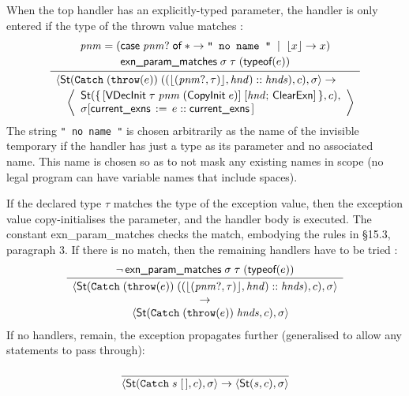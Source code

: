 \documentclass[11pt]{article}
\begin{document}
When the top handler has an explicitly-typed parameter, the handler is
only entered if the type of the thrown value matches
:
\[
\infer{
  \begin{array}{l}
    \statebrack{
      \textsf{St}(\texttt{Catch}\;
                    (\texttt{throw}(e))\;
                    ((\lfloor(\mathit{pnm?},\tau)\rfloor, \mathit{hnd})::
                     \mathit{hnds}),c),
      \sigma
    }
    \to\\[.5ex]
    \quad \left\langle
      \begin{array}{l}
        \textsf{St}(
           \mathbf{\{}\,[\textsf{VDecInit}\;\tau\;\mathit{pnm}\;
                                            (\textsf{CopyInit}\;e)]\;
                        [\mathit{hnd};\,\textsf{ClearExn}]\,\mathbf{\}}, c),\\
        \sigma[\textsf{current\_exns}\,:=\,e::\textsf{current\_exns}\,]
      \end{array}\right\rangle
  \end{array}
}{
  \begin{array}{c}
  \mathit{pnm} = (\textsf{case}\;\mathit{pnm?}\;\textsf{of}\;*\to \texttt{" no name "}
  \;\;|\;\; \lfloor x \rfloor \to x)\\[.5ex]
  \textsf{exn\_param\_matches}\;\sigma\;\tau\;(\textsf{typeof}(e))
  \end{array}
}
\]
The string \texttt{" no name "} is chosen arbitrarily as the name of
the invisible temporary if the handler has just a type as its
parameter and no associated name.  This name is chosen so as to not
mask any existing names in scope (no legal \cpp{} program can have
variable names that include spaces).

If the declared type $\tau$ matches the type of the exception value,
then the exception value copy-initialises the parameter, and the
handler body is executed.  The constant \textsf{exn\_param\_matches}
checks the match, embodying the rules in \S15.3, paragraph 3.  If
there is no match, then the remaining handlers have to be tried
:
\[
\infer{
  \begin{array}{c}
    \statebrack{
      \textsf{St}(\texttt{Catch}\;
                    (\texttt{throw}(e))\;
                    ((\lfloor(\mathit{pnm?},\tau)\rfloor, \mathit{hnd})::
                     \mathit{hnds}), c),
      \sigma
    }\\
    \to\\
    \quad\statebrack{
      \textsf{St}(\texttt{Catch}\;(\texttt{throw}(e))\;\mathit{hnds},c),
      \sigma
    }
  \end{array}
}{
  \lnot\,\textsf{exn\_param\_matches}\;\sigma\;\tau\;(\textsf{typeof}(e))
}
\]
If no handlers, remain, the exception propagates further
 (generalised to allow any statements to
pass through):
\[
\infer{
  \statebrack{
    \textsf{St}(\texttt{Catch}\;s\;[\,], c),
    \sigma
  }
  \to
  \statebrack{\textsf{St}(s, c), \sigma}
}{\rule{0mm}{2ex}}
\]
\end{document}
